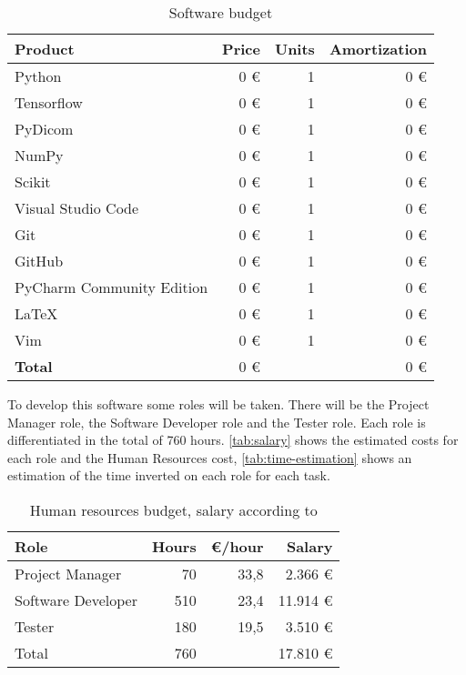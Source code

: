 \begin{table}[H]
  \centering
  \begin{tabular}{|l|r|r|r|}
    \hline
    \textbf{Product} & \textbf{Price} & \textbf{Units} & \textbf{Amortization} \\ \hline\hline

    Python & 0 € & 1 & 0 € \\ \hline
    Tensorflow & 0 € & 1 & 0 € \\ \hline
    PyDicom & 0 € & 1 & 0 € \\ \hline
    NumPy & 0 € & 1 & 0 € \\ \hline
    Scikit & 0 € & 1 & 0 € \\ \hline
    Visual Studio Code & 0 € & 1 & 0 € \\ \hline
    Git & 0 € & 1 & 0 € \\ \hline
    GitHub & 0 € & 1 & 0 € \\ \hline
    PyCharm Community Edition & 0 € & 1 & 0 € \\ \hline
    \LaTeX & 0 € & 1 & 0 € \\ \hline
    Vim & 0 € & 1 & 0 € \\ \hline

    \hline\hline
    \textbf{Total} & 0 € &  & 0  € \\ \hline
  \end{tabular}
  \caption{Software budget \label{tab:software-budget}}
\end{table}



To develop this software some roles will be taken. There will be the Project Manager role,
the Software Developer role and the Tester role. Each role is differentiated in the total
of 760 hours. \autoref{tab:salary} shows the estimated costs for each role and the
Human Resources cost, \autoref{tab:time-estimation} shows an estimation of the time 
inverted on each role for each task.

\begin{table}[H]
  \centering
  \begin{tabular}{|l|r|r|r|}
    \hline
    \textbf{Role} & \textbf{Hours} & \textbf{€/hour} & \textbf{Salary} \\ \hline\hline

    Project Manager & 70 & 33,8 & 2.366 € \\ \hline
    Software Developer & 510 & 23,4 & 11.914 € \\ \hline
    Tester & 180 & 19,5 & 3.510 € \\ \hline

    \hline\hline 
    Total & 760 & & 17.810 € \\
    \hline
  \end{tabular}

  \caption{Human resources budget, salary according to \cite{ine:salary} \label{tab:salary}}
\end{table}

